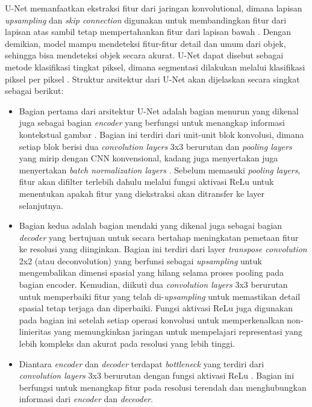 \noindent U-Net memanfaatkan ekstraksi fitur dari jaringan konvolutional, dimana lapisan \textit{upsampling} dan \textit{skip connection} digunakan untuk membandingkan fitur dari lapisan atas sambil tetap mempertahankan fitur dari lapisan bawah \cite{huang_fully_2022}. Dengan demikian, model mampu mendeteksi fitur-fitur detail dan umum dari objek, sehingga bisa mendeteksi objek secara akurat. U-Net dapat disebut sebagai metode klasifikasi tingkat piksel, dimana segmentasi dilakukan melalui klasifikasi piksel per piksel \cite{siddique_u-net_2020}. Struktur arsitektur dari U-Net akan dijelaskan secara singkat sebagai berikut:

\begin{itemize}
	\item Bagian pertama dari arsitektur U-Net adalah bagian menurun yang dikenal juga sebagai bagian \textit{encoder} yang berfungsi untuk menangkap informasi kontekstual gambar \cite{azad_medical_2022}. Bagian ini terdiri dari unit-unit blok konvolusi, dimana setiap blok berisi dua \textit{convolution layers} 3x3 berurutan dan \textit{pooling layers} yang mirip dengan CNN konvensional, kadang juga menyertakan juga menyertakan \textit{batch normalization layers} \cite{younisse_fine-tuning_2023}. Sebelum memasuki \textit{pooling layers}, fitur akan difilter terlebih dahulu melalui fungsi aktivasi ReLu untuk menentukan apakah fitur yang diekstraksi akan ditransfer ke layer selanjutnya.
	
	\item Bagian kedua adalah bagian mendaki yang dikenal juga sebagai bagian \textit{decoder} yang bertujuan untuk secara bertahap meningkatan pemetaan fitur ke resolusi yang diinginkan\cite{siddique_u-net_2020}. Bagian ini terdiri dari layer \textit{transpose convolution} 2x2 (atau deconvolution) yang berfunsi sebagai \textit{upsampling} untuk mengembalikan dimensi spasial yang hilang selama proses pooling pada bagian encoder. Kemudian, diikuti dua \textit{convolution layers} 3x3 berurutan untuk memperbaiki fitur yang telah di-\textit{upsampling} untuk memastikan detail spasial tetap terjaga dan diperbaiki\cite{purushothaman_image_2022}. Fungsi aktivasi ReLu juga digunakan pada bagian ini setelah setiap operasi konvolusi untuk memperkenalkan non-linieritas yang memungkinkan jaringan untuk mempelajari representasi yang lebih kompleks dan akurat pada resolusi yang lebih tinggi\cite{huang_fully_2022}.
	
	\item Diantara \textit{encoder} dan \textit{decoder} terdapat \textit{bottleneck} yang terdiri dari \textit{convolution layers} 3x3 berurutan dengan fungsi aktivasi ReLu \cite{azad_medical_2022}. Bagian ini berfungsi untuk menangkap fitur pada resolusi terendah dan menghubungkan informasi dari \textit{encoder} dan \textit{deceoder}.
	

\end{itemize}
